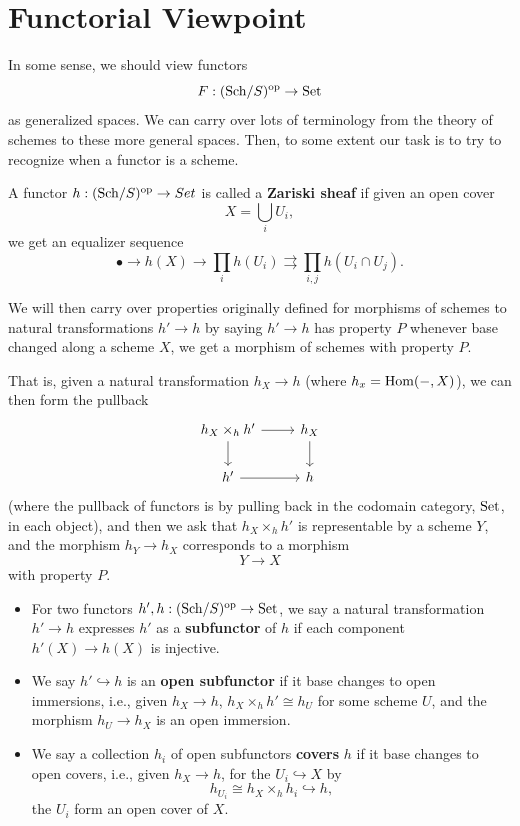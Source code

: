 \documentclass[12pt]{article}
\begin{document}
\section{Functorial Viewpoint}

In some sense, we should view functors
\[F: (\mathrm{Sch}/S)^{\mathrm{op}} \to \mathrm{Set}\]
as generalized spaces. We can carry over lots of terminology from the theory of schemes to these more general spaces. Then, to some extent our task is to try to recognize when a functor is a scheme.

\begin{defn}
    A functor $h:(\mathrm{Sch}/S)^{\mathrm{op}} \to Set$ is called a \textbf{Zariski sheaf} if given an open cover
    \[X = \bigcup_i U_i,\]
    we get an equalizer sequence
    \[\bullet \to h(X) \to \prod_i h(U_i) \rightrightarrows \prod_{i,j} h(U_i\cap U_j).\]
\end{defn}

We will then carry over properties originally defined for morphisms of schemes to natural transformations $h'\to h$ by saying $h'\to h$ has property $P$ whenever base changed along a scheme $X$, we get a morphism of schemes with property $P$.

That is, given a natural transformation $h_X \to h$ (where $h_x = \mathrm{Hom}(-,X)$), we can then form the pullback
\[\begin{tikzcd}
h_X \times_h h' \dar\rar & h_X \dar\\
h' \rar & h
\end{tikzcd}\]
(where the pullback of functors is by pulling back in the codomain category, $\mathrm{Set}$, in each object), and then we ask that $h_X\times_h h'$ is representable by a scheme $Y$, and the morphism $h_Y\to h_X$ corresponds to a morphism
\[Y\to X\]
with property $P$.

\begin{defn}
    \begin{itemize}
        \item For two functors $h',h: (\mathrm{Sch}/S)^{\mathrm{op}} \to \mathrm{Set}$, we say a natural transformation $h' \to h$ expresses $h'$ as a \textbf{subfunctor} of $h$ if each component $h'(X)\to h(X)$ is injective.
        
        \item We say $h' \hookrightarrow h$ is an \textbf{open subfunctor} if it base changes to open immersions, i.e., given $h_X\to h$, $h_X \times_h h' \cong h_U$ for some scheme $U$, and the morphism $h_U\to h_X$ is an open immersion.
        
        \item We say a collection $h_i$ of open subfunctors \textbf{covers} $h$ if it base changes to open covers, i.e., given $h_X\to h$, for the $U_i\hookrightarrow X$ by
        \[h_{U_i} \cong h_X \times_h h_i \hookrightarrow h,\]
        the $U_i$ form an open cover of $X$.
    \end{itemize}
\end{defn}
\end{document}
